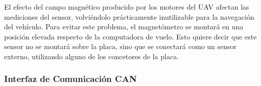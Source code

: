 El efecto del campo magnético producido por los motores del UAV afectan las mediciones del sensor, volviéndolo prácticamente inutilizable para la navegación del vehículo. Para evitar este problema, el magnetómetro se montará en una posición elevada respecto de la computadora de vuelo. Esto quiere decir que este sensor no se montará sobre la placa, sino que se conectará como un sensor externo, utilizando alguno de los concetores de la placa.

\subsubsection{Interfaz de Comunicación CAN}




